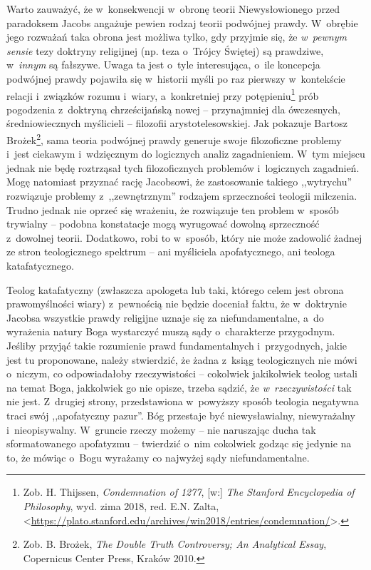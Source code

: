 Warto zauważyć, że w~konsekwencji w~obronę teorii Niewysłowionego przed paradoksem Jacobs angażuje pewien rodzaj teorii podwójnej prawdy. W~obrębie jego rozważań taka obrona jest możliwa tylko, gdy przyjmie się, że \textit{w~pewnym sensie} tezy doktryny religijnej (np. teza o~Trójcy Świętej) są prawdziwe, w~\textit{innym} są fałszywe. Uwaga ta jest o~tyle interesująca, o~ile koncepcja podwójnej prawdy pojawiła się w~historii myśli po raz pierwszy w~kontekście relacji i~związków rozumu i~wiary, a~konkretniej przy potępieniu\footnote{Zob. H. Thijssen, \textit{Condemnation of 1277}, [w:] \textit{The Stanford Encyclopedia of Philosophy}, wyd. zima 2018, red. E.N. Zalta, {\textless}\url{https://plato.stanford.edu/archives/win2018/entries/condemnation/}{\textgreater}.} prób pogodzenia z~doktryną chrześcijańską nowej -- przynajmniej dla ówczesnych, średniowiecznych myślicieli -- filozofii arystotelesowskiej. Jak pokazuje Bartosz Brożek\footnote{Zob. B. Brożek, \textit{The Double Truth Controversy; An Analytical Essay}, Copernicus Center Press, Kraków 2010.}, sama teoria podwójnej prawdy generuje swoje filozoficzne problemy i~jest ciekawym i~wdzięcznym do logicznych analiz zagadnieniem. W~tym miejscu jednak nie będę roztrząsał tych filozoficznych problemów i~logicznych zagadnień. Mogę natomiast przyznać rację Jacobsowi, że zastosowanie takiego ,,wytrychu'' rozwiązuje problemy z~,,zewnętrznym'' rodzajem sprzeczności teologii milczenia. Trudno jednak nie oprzeć się wrażeniu, że rozwiązuje ten problem w~sposób trywialny -- podobna konstatacje mogą wyrugować dowolną sprzeczność z~dowolnej teorii. Dodatkowo, robi to w~sposób, który nie może zadowolić żadnej ze stron teologicznego spektrum -- ani myśliciela apofatycznego, ani teologa katafatycznego.

Teolog katafatyczny (zwłaszcza apologeta lub taki, którego celem jest obrona prawomyślności wiary) z~pewnością nie będzie doceniał faktu, że w~doktrynie Jacobsa wszystkie prawdy religijne uznaje się za niefundamentalne, a~do wyrażenia natury Boga wystarczyć muszą sądy o~charakterze przygodnym. Jeśliby przyjąć takie rozumienie prawd fundamentalnych i~przygodnych, jakie jest tu proponowane, należy stwierdzić, że żadna z~ksiąg teologicznych nie mówi o~niczym, co odpowiadałoby rzeczywistości -- cokolwiek jakikolwiek teolog ustali na temat Boga, jakkolwiek go nie opisze, trzeba sądzić, że \textit{w~rzeczywistości} tak nie jest. Z~drugiej strony, przedstawiona w~powyższy sposób teologia negatywna traci swój ,,apofatyczny pazur''. Bóg przestaje być niewysławialny, niewyrażalny i~nieopisywalny. W~gruncie rzeczy możemy -- nie naruszając ducha tak sformatowanego apofatyzmu -- twierdzić o~nim cokolwiek godząc się jedynie na to, że mówiąc o~Bogu wyrażamy co najwyżej sądy niefundamentalne.

